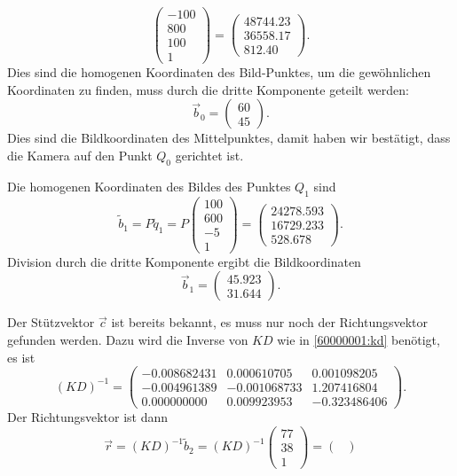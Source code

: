 \begin{loesung}
\begin{teilaufgaben}
\[\begin{pmatrix}
-100\\800\\100\\1
\end{pmatrix}
=
\begin{pmatrix}
   48744.23\\
   36558.17\\
     812.40
\end{pmatrix}.
\]
Dies sind die homogenen Koordinaten des Bild-Punktes, um die gewöhnlichen
Koordinaten zu finden, muss durch die dritte Komponente geteilt werden:
\[
\vec b_0
=
\begin{pmatrix}
60\\45
\end{pmatrix}.
\]
Dies sind die Bildkoordinaten des Mittelpunktes, damit haben
wir bestätigt, dass die Kamera auf den Punkt $Q_0$ gerichtet ist.
\item
Die homogenen Koordinaten des Bildes des Punktes $Q_1$ sind
\[
\tilde b_1
=
P\tilde q_1
=
P\begin{pmatrix}100\\600\\-5\\1\end{pmatrix}
=
\begin{pmatrix}
   24278.593\\
   16729.233\\
     528.678
\end{pmatrix}.
\]
Division durch die dritte Komponente ergibt die Bildkoordinaten
\[
\vec b_1 = \begin{pmatrix}
   45.923\\
   31.644
\end{pmatrix}.
\]
\item
Der Stützvektor $\vec c$ ist bereits bekannt, es muss nur noch der Richtungsvektor
gefunden werden.
Dazu wird die Inverse von $KD$ wie in \eqref{60000001:kd} benötigt,
es ist
\[
(KD)^{-1}
=
\begin{pmatrix}
  -0.008682431&  0.000610705&  0.001098205\\
  -0.004961389& -0.001068733&  1.207416804\\
   0.000000000&  0.009923953& -0.323486406
\end{pmatrix}.
\]
Der Richtungsvektor ist dann
\[
\vec r = (KD)^{-1}\tilde b_2 = (KD)^{-1} \begin{pmatrix} 77\\ 38\\ 1\end{pmatrix}
=
\begin{pmatrix}

\end{pmatrix}\]
\end{teilaufgaben}
\end{loesung}
